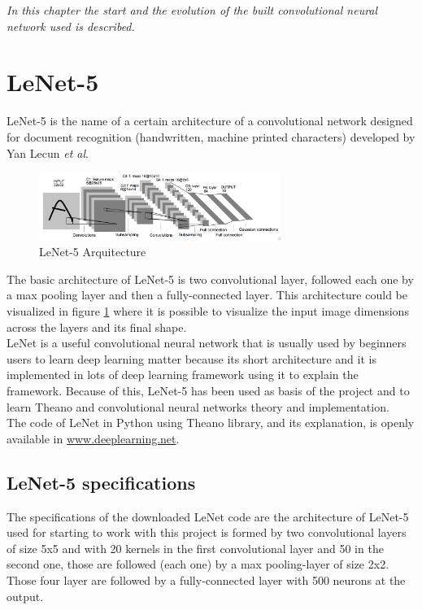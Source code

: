 \minitoc
\mtcskip

\begin{small}
\emph{In this chapter the start and the evolution of the built convolutional neural network used is described.\\}
\end{small} 

\section{LeNet-5}
LeNet-5 \cite{Lenet5} is the name of a certain architecture of a convolutional network designed for document recognition (handwritten, machine printed characters) developed by Yan Lecun \textit{et al}.\\

\begin{figure}[htb]
  \centering
  \includegraphics[width=0.7\textwidth]{images/images_lenet/LenetArquitectura.png}
  \caption{LeNet-5 Arquitecture}
  \label{Lenet5Arquitectura}
\end{figure}

The basic architecture of LeNet-5 is two convolutional layer, followed each one by a max pooling layer and then a fully-connected layer. This architecture could be visualized in figure \ref{Lenet5Arquitectura} where it is possible to visualize the input image dimensions across the layers and its final shape.\\

LeNet is a useful convolutional neural network that is usually used by beginners users to learn deep learning matter because its short architecture and it is implemented in lots of deep learning framework using it to explain the framework. Because of this, LeNet-5 has been used as basis of the project and to learn Theano and convolutional neural networks theory and implementation.\\

The code of LeNet in Python using Theano library, and its explanation, is openly available in \url{www.deeplearning.net}.\\

\subsection{LeNet-5 specifications}
The specifications of the downloaded LeNet code are the architecture of LeNet-5 used for starting to work with this project is formed by two convolutional layers of size 5x5 and with 20 kernels in the first convolutional layer and 50 in the second one, those are followed (each one) by a max pooling-layer of size 2x2. Those four layer are followed by a fully-connected layer with 500 neurons at the output.\\

